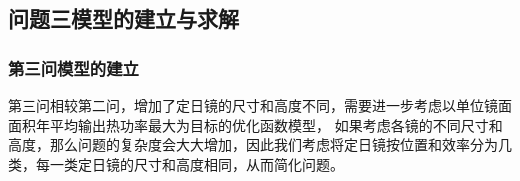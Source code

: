 \documentclass{数学建模}
\begin{document}
\begin{center}
    \renewcommand{\arraystretch}{1.5}
    \begin{table}[htbp]
        \centering
        \caption{问题二年平均光学效率及输出功率表}
        \label{tab:example}
      \end{table}
\end{center}

\begin{table}[H]
    \centering
    \renewcommand{\arraystretch}{1.5}
    \caption{问题二设计参数表}
    \label{tab:example}
  \end{table}






\subsection{问题三模型的建立与求解}
\subsubsection{第三问模型的建立}
第三问相较第二问，增加了定日镜的尺寸和高度不同，需要进一步考虑以单位镜面面积年平均输出热功率最大为目标的优化函数模型，
如果考虑各镜的不同尺寸和高度，那么问题的复杂度会大大增加，因此我们考虑将定日镜按位置和效率分为几类，每一类定日镜的尺寸和高度相同，从而简化问题。
\end{document}
